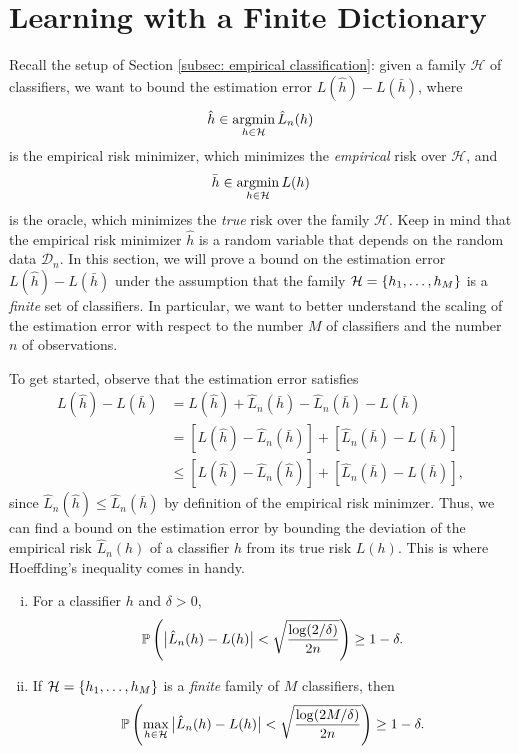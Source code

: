 \section{Learning with a Finite Dictionary}

Recall the setup of Section \ref{subsec: empirical classification}: given a family $\mathcal{H}$ of classifiers, we want to bound the estimation error $L(\hat h) - L(\bar h)$, where
\[
    \hat h \in \operatorname*{argmin}_{h \in \mathcal{H}} \hat L_n(h)
\]
is the empirical risk minimizer, which minimizes the \emph{empirical} risk over $\mathcal{H}$, and
\[
    \bar h \in \operatorname*{argmin}_{h \in \mathcal{H}} L(h)
\]
is the oracle, which minimizes the \emph{true} risk over the family $\mathcal{H}$. Keep in mind that the empirical risk minimizer $\hat h$ is a random variable that depends on the random data $\mathcal{D}_n$. In this section, we will prove a bound on the estimation error $L(\hat h) - L(\bar h)$ under the assumption that the family $\mathcal{H} = \left\{h_1, \dots, h_M\right\}$ is a \emph{finite} set of classifiers. In particular, we want to better understand the scaling of the estimation error with respect to the number $M$ of classifiers and the number $n$ of observations.

To get started, observe that the estimation error satisfies
\begin{align*}
    L(\hat h) - L(\bar h) &= L(\hat h) + \hat L_n(\bar h) - \hat L_n(\bar h) - L(\bar h) \\
        &= \left[L(\hat h) - \hat L_n(\bar h)\right] + \left[\hat L_n(\bar h) - L(\bar h)\right] \\
        &\leq \left[L(\hat h) - \hat L_n(\hat h)\right] + \left[\hat L_n(\bar h) - L(\bar h)\right],
\end{align*}
since $\hat L_n(\hat h) \leq \hat L_n(\bar h)$ by definition of the empirical risk minimzer. Thus, we can find a bound on the estimation error by bounding the deviation of the empirical risk $\hat L_n(h)$ of a classifier $h$ from its true risk $L(h)$. This is where Hoeffding's inequality comes in handy.

\begin{theorem}
\label{thm: empirical vs true risk}
\begin{enumerate}[(i)]
    \item For a classifier $h$ and $\delta > 0$,
    \[
        \mathbb{P}\left(\big\lvert \hat L_n(h) - L(h) \big\rvert < \sqrt{\frac{\log(2/\delta)}{2n}}\right) \geq 1 - \delta.
    \]

    \item If $\mathcal{H} = \left\{h_1, \dots, h_M\right\}$ is a \emph{finite} family of $M$ classifiers, then
    \[
        \mathbb{P}\left(\max_{h \in \mathcal{H}} \big\lvert \hat L_n(h) - L(h) \big\rvert < \sqrt{\frac{\log(2M/\delta)}{2n}}\right) \geq 1 - \delta.
    \]
\end{enumerate}
\end{theorem}

